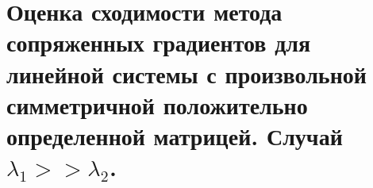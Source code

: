 \section{Оценка сходимости метода сопряженных градиентов для линейной системы с произвольной симметричной положительно определенной матрицей. Случай $\lambda_1 >> \lambda_2$.}